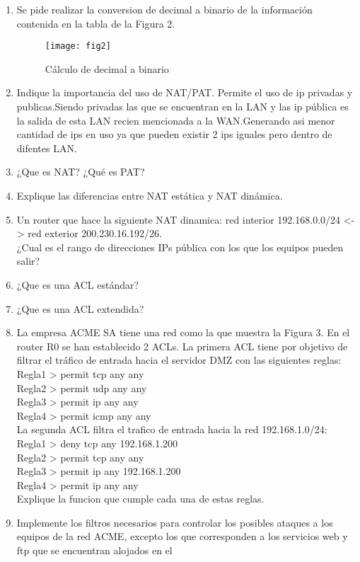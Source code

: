 \documentclass{udparticle}
\begin{document}
\begin{enumerate}
\item Se pide realizar la conversion de decimal a binario de la información contenida en la tabla de la Figura 2.
	\begin{figure}[H]
	\centering
	\texttt{[image: fig2]}
	\caption{Cálculo de decimal a binario}
	\end{figure}

\item Indique la importancia del uso de NAT/PAT.
Permite el uso de ip privadas y publicas.Siendo privadas las que se encuentran en la LAN y las ip pública es la
salida de esta LAN recien mencionada a la WAN.Generando asi menor cantidad de ips en uso ya que pueden existir
2 ips iguales pero dentro de difentes LAN.\\
\item ¿Que es NAT? ¿Qué es PAT?
\item Explique las diferencias entre NAT estática y NAT dinámica.
\item Un router que hace la siguiente NAT dinamica: red interior 
192.168.0.0/24 <-> red exterior 200.230.16.192/26.\\
¿Cual es el rango de direcciones IPs pública con los que los equipos 
pueden salir?
\item ¿Que es una ACL estándar?
\item ¿Que es una ACL extendida?
\item La empresa ACME SA tiene una red como la que muestra la Figura 3. 
En el router R0 se han establecido 2 ACLs. La primera ACL tiene por 
objetivo de filtrar el tráfico de entrada hacia el 
servidor DMZ con las siguientes reglas:\\
Regla1 > permit tcp any any\\
Regla2 > permit udp any any\\
Regla3 > permit ip any any\\
Regla4 > permit icmp any any\\
La segunda ACL filtra el trafico de entrada hacia la red 
192.168.1.0/24:\\
Regla1 > deny tcp any 192.168.1.200\\
Regla2 > permit tcp any any\\
Regla3 > permit ip any 192.168.1.200\\
Regla4 > permit ip any any\\
Explique la funcion que cumple cada una de estas reglas.\\
\item Implemente los filtros necesarios para controlar los posibles ataques a los equipos de la red ACME, excepto los que corresponden a los servicios web y ftp que se encuentran alojados en el

\end{enumerate}
\end{document}
